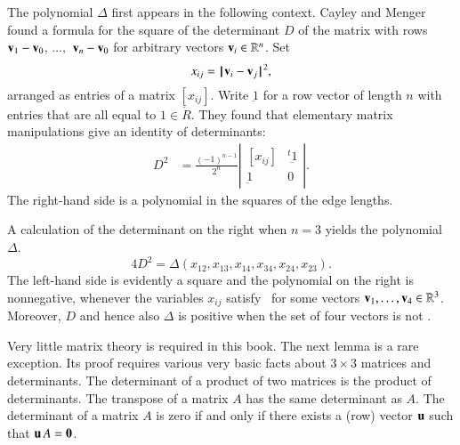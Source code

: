 \begin{remark}\label{rem:cayley}
  The polynomial $\Delta$ first appears in the following context.
  Cayley and Menger found a formula for the square of the determinant
  $D$ of the matrix with rows ${\mathbf v}_1-{\mathbf v}_0$, $\ldots,$ ${\mathbf v}_n-{\mathbf v}_0$ for
  arbitrary vectors ${\mathbf v}_i\in\mathbb{R}^n$.  Set
\begin{equation}\label{eqn:xij}
x_{ij} = \norm{\v_i}{\v_j}^2,
\end{equation}
arranged as entries of a matrix $[x_{ij}]$.
Write $\underbar 1$ for a row vector of length $n$ 
with entries that are all equal to $1\in\ring{R}$.
They found that elementary matrix manipulations give an identity
of determinants:
\begin{align}\label{eqn:cmd}
D^2 &= \frac{(-1)^{n-1}}{2^n}
\left|\begin{matrix}[x_{ij}]& {}^t{\underbar 1}\\ {\underbar 1}& 0
\end{matrix}\right|.
\end{align}
The right-hand side is a polynomial in the squares of the edge lengths.

A calculation of the determinant on the right when $n=3$ yields 
the polynomial $\Delta$.
\[ 
4 D^2 = \Delta(x_{12},x_{13},x_{14},x_{34},x_{24},x_{23}).
\] 
The left-hand side is evidently a square and the polynomial on the
right is nonnegative, whenever the variables $x_{ij}$
satisfy~ for some vectors
${\mathbf v}_1,\ldots,{\mathbf v}_4\in\mathbb{R}^3$.  Moreover, $D$ and hence also
$\Delta$ is positive when the set of four vectors is not
.
\end{remark}
%
%
%
%
%

\begin{background}\label{back:matrix}
  Very little matrix theory is required in this book.  The next lemma
  is a rare exception.  Its proof requires various very basic facts
  about $3\times 3$ matrices and determinants.  The determinant of a
  product of two matrices is the product of determinants.  The
  transpose of a matrix $A$ has the same determinant as $A$.  The
  determinant of a matrix $A$ is zero if and only if there exists a
  (row) vector ${\mathbf u}$ such that ${\mathbf u}\, A = {\mathbf 0}$.
\end{background}

